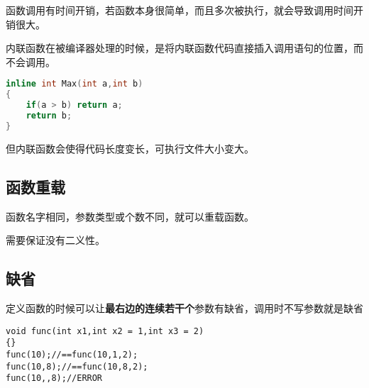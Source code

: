 \documentclass[UTF8]{ctexart}
\begin{document}
函数调用有时间开销，若函数本身很简单，而且多次被执行，就会导致调用时间开销很大。

内联函数在被编译器处理的时候，是将内联函数代码直接插入调用语句的位置，而不会调用。

\begin{lstlisting}[language=C++]
inline int Max(int a,int b)
{
	if(a > b) return a;
	return b;
}
\end{lstlisting}

但内联函数会使得代码长度变长，可执行文件大小变大。

\subsection{函数重载}

函数名字相同，参数类型或个数不同，就可以重载函数。

需要保证没有二义性。

\subsection{缺省}

定义函数的时候可以让\textbf{最右边的连续若干个}参数有缺省，调用时不写参数就是缺省
\begin{lstlisting}
void func(int x1,int x2 = 1,int x3 = 2)
{}
func(10);//==func(10,1,2);
func(10,8);//==func(10,8,2);
func(10,,8);//ERROR
\end{lstlisting}
\end{document}
